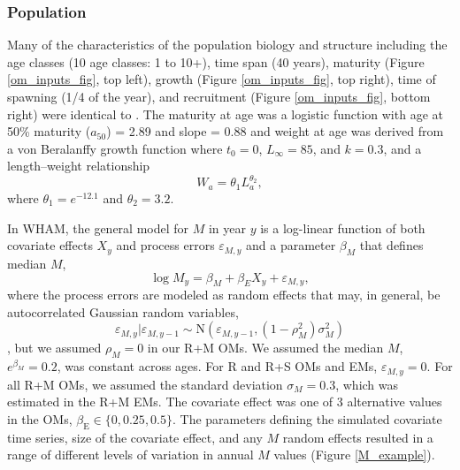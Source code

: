 \documentclass[
  12pt,
]{article}
\begin{document}
\subsubsection*{Population}\label{population}

Many of the characteristics of the population biology and structure including the age classes (10 age classes: 1 to 10+), time span (40 years), maturity (Figure \ref{om_inputs_fig}, top left), growth (Figure \ref{om_inputs_fig}, top right), time of spawning (1/4 of the year), and recruitment (Figure \ref{om_inputs_fig}, bottom right) were identical to \citet{milleretal_inreview1}. The maturity at age was a logistic function with age at 50\% maturity (\(a_{50}\)) = 2.89 and slope = 0.88 and weight at age was derived from a von Beralanffy growth function where \(t_0 = 0\), \(L_\infty = 85\), and \(k = 0.3\), and a length--weight relationship
\[
W_a = \theta_1 L_a^{\theta_2},
\]
where \(\theta_1 = e^{-12.1}\) and \(\theta_2 = 3.2\).

In WHAM, the general model for \(M\) in year \(y\) is a log-linear function of both covariate effects \(X_y\) and process errors \(\varepsilon_{M,y}\) and a parameter \(\beta_{M}\) that defines median \(M\),
\[
\log M_y = \beta_M + \beta_{E} X_y + \varepsilon_{M,y},
\]
where the process errors are modeled as random effects that may, in general, be autocorrelated Gaussian random variables,
\[
\varepsilon_{M,y}|\varepsilon_{M,y-1} \sim \text{N}\left(\varepsilon_{M,y-1},(1-\rho_M^2)\sigma_M^2\right)
\]
\citep{stockmiller21}, but we assumed \(\rho_M = 0\) in our R+M OMs. We assumed the median \(M\), \(e^{\beta_M} = 0.2\), was constant across ages. For R and R+S OMs and EMs, \(\varepsilon_{M,y} = 0\). For all R+M OMs, we assumed the standard deviation \(\sigma_M = 0.3\), which was estimated in the R+M EMs. The covariate effect was one of 3 alternative values in the OMs, \(\beta_\text{E} \in \{0,0.25,0.5\}\). The parameters defining the simulated covariate time series, size of the covariate effect, and any \(M\) random effects resulted in a range of different levels of variation in annual \(M\) values (Figure \ref{M_example}).
\end{document}
